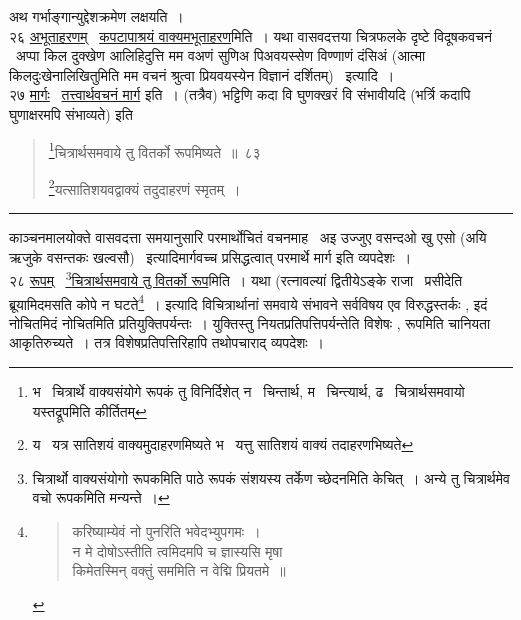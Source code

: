 \documentclass[11pt, openany]{book}
\begin{document}
अथ गर्भाङ्गान्युद्देशक्रमेण लक्षयति~।\\

२६ \underline{अभूताहरणम्} \textendash\ \underline{कपटापाश्रयं वाक्यमभूताहरण}मिति~। यथा वासवदत्तया चित्रफलके दृष्टे विदूषकवचनं \textendash\ अप्पा किल दुक्खेण आलिहिदुत्ति मम वअणं सुणिअ पिअवयस्सेण विण्णाणं दंसिअं (आत्मा किलदुःखेनालिखितुमिति मम वचनं श्रुत्वा प्रियवयस्येन विज्ञानं दर्शितम्) \textendash\ इत्यादि~।\\

२७ \underline{मार्गः} \textendash\ \underline{तत्त्वार्थवचनं मार्ग} इति~। (तत्रैव) {\qt भट्टिणि कदा वि घुणक्खरं वि संभावीयदि (भर्त्रि कदापि घुणाक्षरमपि संभाव्यते)} इति

\newpage

\begin{quote}
{\na \renewcommand{\thefootnote}{1}\footnote{भ \textendash\ चित्रार्थे वाक्यसंयोगे रूपकं तु विनिर्दिशेत् न \textendash\ चिन्तार्थ, म \textendash\ चिन्त्यार्थ, ढ \textendash\ चित्रार्थसमवायो यस्तद्रूपमिति कीर्तितम्}चित्रार्थसमवाये तु वितर्को रूपमिष्यते~॥~८३

\renewcommand{\thefootnote}{2}\footnote{य \textendash\ यत्र सातिशयं वाक्यमुदाहरणमिष्यते भ \textendash\ यत्तु सातिशयं वाक्यं तदाहरणभिष्यते}यत्सातिशयवद्वाक्यं तदुदाहरणं स्मृतम्~।}
\end{quote}

\hrule

\vspace{2mm}
\noindent
काञ्चनमालयोक्ते वासवदत्ता समयानुसारि परमार्थोचितं वचनमाह \textendash\ अइ उज्जुए वसन्दओ खु एसो (अयि ऋजुके वसन्तकः खल्वसौ) \textendash\ इत्यादिमार्गवच्च प्रसिद्धत्वात् परमार्थे मार्ग इति व्यपदेशः~।\\

२८ \underline{रूपम्} \textendash\ \underline{\renewcommand{\thefootnote}{*}\footnote{चित्रार्थो वाक्यसंयोगो रूपकमिति पाठे रूपकं संशयस्य तर्केण च्छेदनमिति केचित्~। अन्ये तु चित्रार्थमेव वचो रूपकमिति मन्यन्ते~।}चित्रार्थसमवाये तु वितर्को रूप}मिति~। यथा (रत्नावल्यां द्वितीयेऽङ्के राजा \textendash\ प्रसीदेति ब्रूयामिदमसति कोपे न घटते\renewcommand{\thefootnote}{$\dagger$}\footnote{\begin{quote}
{\qt करिष्याम्येवं नो पुनरिति भवेदभ्युपगमः~।\\
न मे दोषोऽस्तीति त्वमिदमपि च ज्ञास्यसि मृषा\\
किमेतस्मिन् वक्तुं सममिति न वेद्मि प्रियतमे~॥}
\end{quote}}~। इत्यादि विचित्रार्थानां समवाये संभावने सर्वविषय एव विरुद्धस्तर्कः , इदं नोचितमिदं नोचितमिति प्रतियुक्तिपर्यन्तः~। युक्तिस्तु नियतप्रतिपत्तिपर्यन्तेति विशेषः , रूपमिति चानियता आकृतिरुच्यते~। तत्र विशेषप्रतिपत्तिरिहापि तथोपचाराद् व्यपदेशः~।\\
\end{document}
